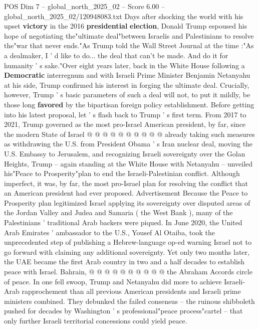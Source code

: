 \begin{textsample}{POS Dim 7 – global\_north\_2025\_02 – Score 6.00 – global\_north\_2025\_02/120948083.txt}  \label{ex:f7_pos_285}
Days after shocking the world with his upset \textbf{victory} in the 2016 \textbf{presidential} \textbf{election}, Donald Trump espoused his hope of negotiating the"ultimate deal"between Israelis and Palestinians to resolve the"war that never ends."As Trump told the Wall Street Journal at the time :"As a dealmaker, I ' d like to do... the deal that can't be made.
And do it for humanity ' s sake."Over eight years later, back in the White House following a \textbf{Democratic} interregnum and with Israeli Prime Minister Benjamin Netanyahu at his side, Trump confirmed his interest in forging the ultimate deal.
Crucially, however, Trump ' s basic parameters of such a deal will not, to put it mildly, be those long \textbf{favored} by the bipartisan foreign policy establishment.
Before getting into his latest proposal, let ' s flash back to Trump ' s first term.
From 2017 to 2021, Trump governed as the most pro-Israel American president, by far, since the modern State of Israel @ @ @ @ @ @ @ @ @ @ already taking such measures as withdrawing the U.S. from President Obama ' s Iran nuclear deal, moving the U.S.
Embassy to Jerusalem, and recognizing Israeli sovereignty over the Golan Heights, Trump -- again standing at the White House with Netanyahu -- unveiled his"Peace to Prosperity"plan to end the Israeli-Palestinian conflict.
Although imperfect, it was, by far, the most pro-Israel plan for resolving the conflict that an American president had ever proposed.
Advertisement Because the Peace to Prosperity plan legitimized Israel applying its sovereignty over disputed areas of the Jordan Valley and Judea and Samaria ( the West Bank ), many of the Palestinians ' traditional Arab backers were piqued.
In June 2020, the United Arab Emirates ' ambassador to the U.S., Yousef Al Otaiba, took the unprecedented step of publishing a Hebrew-language op-ed warning Israel not to go forward with claiming any additional sovereignty.
Yet only two months later, the UAE became the first Arab country in two and a half decades to establish peace with Israel.
Bahrain, @ @ @ @ @ @ @ @ @ @ the Abraham Accords circle of peace.
In one fell swoop, Trump and Netanyahu did more to achieve Israeli-Arab rapprochement than all previous American presidents and Israeli prime ministers combined.
They debunked the failed consensus -- the ruinous shibboleth pushed for decades by Washington ' s professional"peace process"cartel -- that only further Israeli territorial concessions could yield peace.

\end{textsample}
